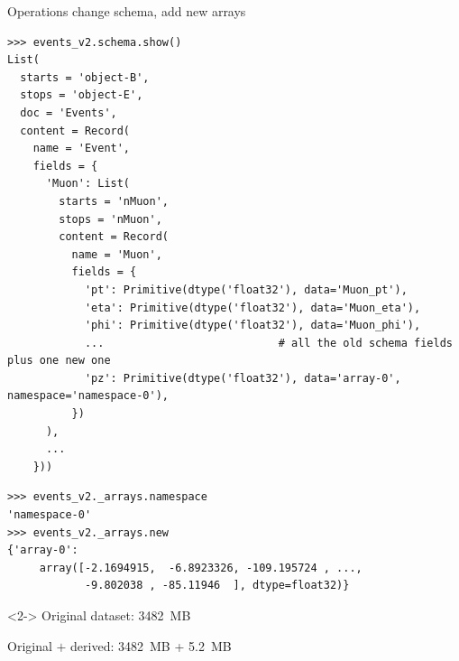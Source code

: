 \documentclass[aspectratio=169]{beamer}
\begin{document}
\begin{frame}[fragile]{Operations change schema, add new arrays}
\vspace{0.15 cm}
\scriptsize
\begin{verbatim}
>>> events_v2.schema.show()
List(
  starts = 'object-B',
  stops = 'object-E',
  doc = 'Events',
  content = Record(
    name = 'Event',
    fields = {
      'Muon': List(
        starts = 'nMuon',
        stops = 'nMuon',
        content = Record(
          name = 'Muon',
          fields = {
            'pt': Primitive(dtype('float32'), data='Muon_pt'),
            'eta': Primitive(dtype('float32'), data='Muon_eta'),
            'phi': Primitive(dtype('float32'), data='Muon_phi'),
            ...                           # all the old schema fields plus one new one
            'pz': Primitive(dtype('float32'), data='array-0', namespace='namespace-0'),
          })
      ),
      ...
    }))
\end{verbatim}

\vspace{-7.7 cm}
\hfill \begin{minipage}{0.6\linewidth}
\begin{verbatim}
>>> events_v2._arrays.namespace
'namespace-0'
>>> events_v2._arrays.new
{'array-0':
     array([-2.1694915,  -6.8923326, -109.195724 , ...,
            -9.802038 , -85.11946  ], dtype=float32)}
\end{verbatim}

\begin{uncoverenv}<2->
\normalsize
Original dataset: 3482~MB

\vspace{0.2 cm}
Original $+$ derived: 3482~MB + 5.2~MB
\end{uncoverenv}
\end{minipage}
\vspace{7.7 cm}
\end{frame}
\end{document}
